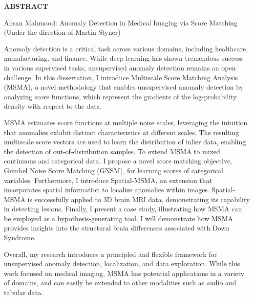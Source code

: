 \begin{center}
\vspace*{52pt}
{\normalfont\textbf{ABSTRACT}}
\vspace{11pt}

\begin{singlespace}
Ahsan Mahmood: Anomaly Detection in Medical Imaging via Score Matching \\
(Under the direction of Martin Styner)
\end{singlespace}
\end{center}

Anomaly detection is a critical task across various domains, including healthcare, manufacturing, and finance. While deep learning has shown tremendous success in various supervised tasks, unsupervised anomaly detection remains an open challenge. In this dissertation, I introduce Multiscale Score Matching Analysis (MSMA), a novel methodology that enables unsupervised anomaly detection by analyzing score functions, which represent the gradients of the log-probability density with respect to the data.

MSMA estimates score functions at multiple noise scales, leveraging the intuition that anomalies exhibit distinct characteristics at different scales. The resulting multiscale score vectors are used to learn the distribution of inlier data, enabling the detection of out-of-distribution samples. To extend MSMA to mixed continuous and categorical data, I propose a novel score matching objective, Gumbel Noise Score Matching (GNSM), for learning scores of categorical variables. Furthermore, I introduce Spatial-MSMA, an extension that incorporates spatial information to localize anomalies within images. Spatial-MSMA is successfully applied to 3D brain MRI data, demonstrating its capability in detecting lesions. Finally, I present a case study, illustrating how MSMA can be employed as a hypothesis-generating tool. I will demonstrate how MSMA provides insights into the structural brain differences associated with Down Syndrome.

Overall, my research introduces a principled and flexible framework for unsupervised anomaly detection, localization, and data exploration. While this work focused on medical imaging, MSMA has potential applications in a variety of domains, and can easily be extended to other modalities such as audio and tabular data.

\clearpage
